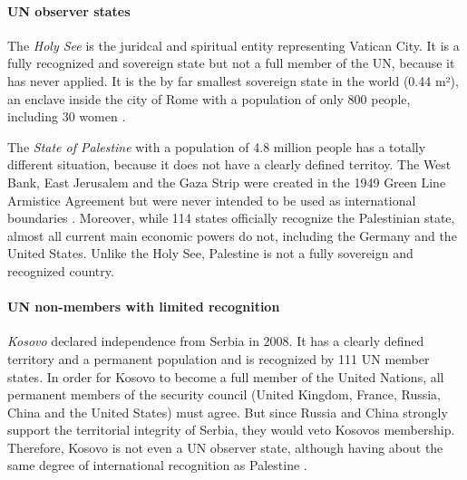 \paragraph{UN observer states} %
\label{par:un_observer_states}

The \emph{Holy See} is the juridcal and spiritual entity representing Vatican City. It is a fully recognized and sovereign state but not a full member of the UN, because it has never applied. It is the by far smallest sovereign state in the world (0.44 m²), an enclave inside the city of Rome with a population of only 800 people, including 30 women \cite{VaticanPopulation}.

The \emph{State of Palestine} with a population of 4.8 million people \cite[as of 2016]{PalestinePopulation} has a totally different situation, because it does not have a clearly defined territoy. The West Bank, East Jerusalem and the Gaza Strip were created in the 1949 Green Line Armistice Agreement but were never intended to be used as international boundaries \cite{PalestineTerritory}. Moreover, while 114 states officially recognize the Palestinian state, almost all current main economic powers do not, including the Germany and the United States. Unlike the Holy See, Palestine is not a fully sovereign and recognized country.


\paragraph{UN non-members with limited recognition} %
\label{par:un_non_members_with_limited_recognition}

\emph{Kosovo} declared independence from Serbia in 2008. It has a clearly defined territory and a permanent population and is recognized by 111 UN member states. In order for Kosovo to become a full member of the United Nations, all permanent members of the security council (United Kingdom, France, Russia, China and the United States) must agree. But since Russia and China strongly support the territorial integrity of Serbia, they would veto Kosovos membership. Therefore, Kosovo is not even a UN observer state, although having about the same degree of international recognition as Palestine \cite{KosovoThanksYou}.

